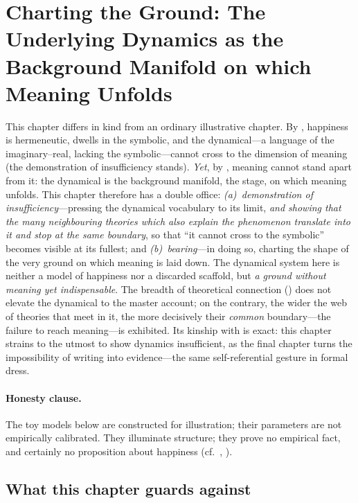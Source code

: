 \section{Charting the Ground: The Underlying Dynamics as the Background Manifold on which Meaning Unfolds}
\label{p19:sec:dynamics}

\noindent
This chapter differs in kind from an ordinary illustrative chapter. By , happiness is hermeneutic, dwells in the symbolic, and the dynamical---a language of the imaginary--real, lacking the symbolic---cannot cross to the dimension of meaning (the demonstration of insufficiency stands). \emph{Yet}, by , meaning cannot stand apart from it: the dynamical is the background manifold, the stage, on which meaning unfolds. This chapter therefore has a double office: \emph{(a)~demonstration of insufficiency}---pressing the dynamical vocabulary to its limit, \emph{and showing that the many neighbouring theories which also explain the phenomenon translate into it and stop at the same boundary}, so that ``it cannot cross to the symbolic'' becomes visible at its fullest; and \emph{(b)~bearing}---in doing so, charting the shape of the very ground on which meaning is laid down. The dynamical system here is neither a model of happiness nor a discarded scaffold, but \emph{a ground without meaning yet indispensable}. The breadth of theoretical connection () does not elevate the dynamical to the master account; on the contrary, the wider the web of theories that meet in it, the more decisively their \emph{common} boundary---the failure to reach meaning---is exhibited. Its kinship with  is exact: this chapter strains to the utmost to show dynamics insufficient, as the final chapter turns the impossibility of writing into evidence---the same self-referential gesture in formal dress.

\paragraph{Honesty clause.} The toy models below are constructed for illustration; their parameters are not empirically calibrated. They illuminate structure; they prove no empirical fact, and certainly no proposition about happiness (cf.\ , ).

\subsection{What this chapter guards against}
\label{p19:sub:dyn-guard}

